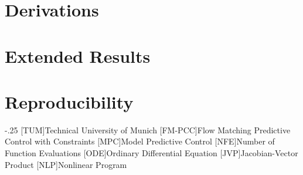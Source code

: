 \documentclass[headsepline,footsepline,footinclude=false,oneside,fontsize=11pt,paper=a4,listof=totoc,bibliography=totoc]{scrbook}
\newcommand{\printbibliography}{}
\begin{document}
\appendix{}

\chapter{Derivations}\label{app:derivations}
\chapter{Extended Results}\label{app:results}
\chapter{Reproducibility}\label{app:repro}


\begin{acronym}
  \itemsep-.25\baselineskip
  [TUM]{Technical University of Munich}
  [FM-PCC]{Flow Matching Predictive Control with Constraints}
  [MPC]{Model Predictive Control}
  [NFE]{Number of Function Evaluations}
  [ODE]{Ordinary Differential Equation}
  [JVP]{Jacobian-Vector Product}
  [NLP]{Nonlinear Program}
\end{acronym}

\listoffigures{}
\listoftables{}

\printbibliography{}
\end{document}
